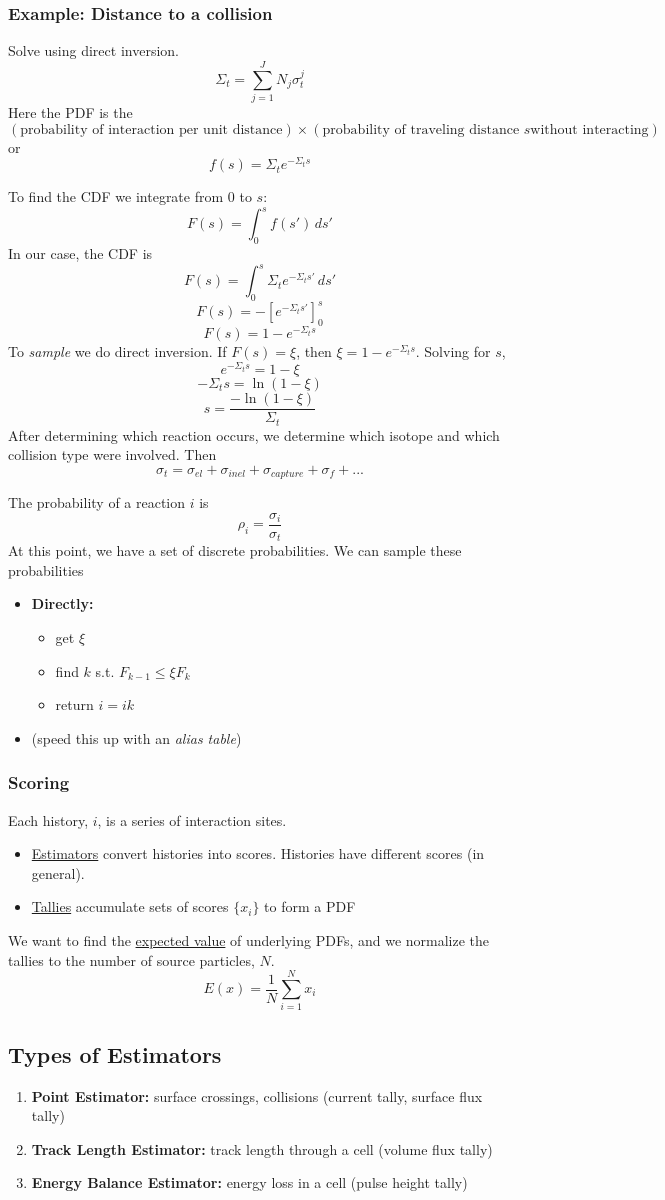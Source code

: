 \documentclass{report}
\newcommand{\hh}[1]{\subsection*{#1}}
\newcommand{\hhh}[1]{\subsubsection*{#1}}
\newcommand{\Xs}{\Sigma}
\newcommand{\xs}{\sigma}
\begin{document}
\hhh{Example: Distance to a collision}
Solve using direct inversion. 
$$ \Xs_t = \sum_{j=1}^{J} N_j\xs_t^j $$
Here the PDF is the 
$$ (\text{probability of interaction per unit distance}) \times (\text{probability of traveling distance }s\text{without interacting}) $$
or
$$ f(s) = \Xs_t e^{-\Xs_t s} $$

To find the CDF we integrate from 0 to $s$:
$$ F(s) = \int_0^s f(s')\, ds' $$
In our case, the CDF is
$$ F(s) = \int_0^s \Xs_t e^{-\Xs_t s'}\, ds' $$
$$ F(s) = -\left[ e^{-\Xs_t s'}\right]_0^s $$
$$ F(s) = 1-e^{-\Xs_t s} $$
To \textit{sample} we do direct inversion. If $F(s) = \xi$, then $\xi = 1-e^{-\Xs_t s}$. Solving for $s$,
$$ e^{-\Xs_t s} = 1-\xi $$
$$ -\Xs_t s = \ln(1-\xi) $$
$$ s = \frac{-\ln(1-\xi)}{\Xs_t} $$
After determining which reaction occurs, we determine which isotope and which collision type were involved. Then 
$$ \xs_t = \xs_{el} + \xs_{inel} + \xs_{capture} + \xs_{f} + ... $$

The probability of a reaction $i$ is
$$ \rho_i = \frac{\xs_i}{\xs_t} $$
At this point, we have a set of discrete probabilities. We can sample these probabilities
\begin{itemize}
\item \textbf{Directly:}
	\begin{itemize}
	\item get $\xi$
	\item find $k$ s.t. $F_{k-1} \leq \xi F_k$
	\item return $i = ik$
	\end{itemize}
\item (speed this up with an \textit{alias table})
\end{itemize}

\hhh{Scoring}
Each history, $i$, is a series of interaction sites. 
\begin{itemize}
\item \underline{Estimators} convert histories into scores. Histories have different scores (in general).
\item \underline{Tallies} accumulate sets of scores $\{ x_i \}$ to form a PDF
\end{itemize}
We want to find the \underline{expected value} of underlying PDFs, and we normalize the tallies to the number of source particles, $N$.
$$ E(x) = \frac{1}{N} \sum_{i=1}^N x_i $$


\hh{Types of Estimators}
\begin{enumerate}
\item \textbf{Point Estimator:} surface crossings, collisions (current tally, surface flux tally)
\item \textbf{Track Length Estimator:} track length through a cell (volume flux tally)
\item \textbf{Energy Balance Estimator:} energy loss in a cell (pulse height tally)
\end{enumerate}
\end{document}
